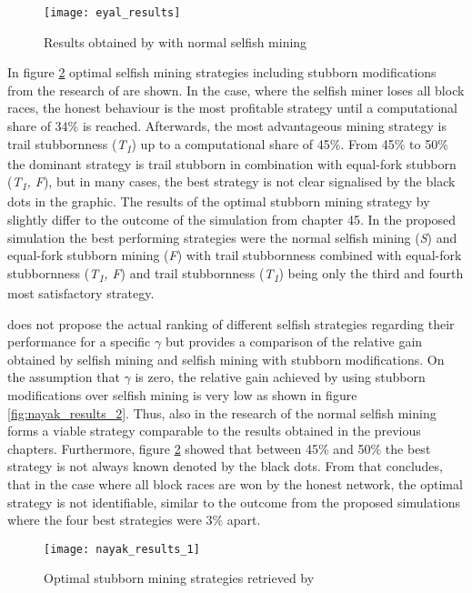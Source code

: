 \begin{figure}[t]
\texttt{[image: eyal\_results]}
\centering
\caption{Results obtained by \cite{eyal2014majority} with normal selfish mining}
\label{fig:eyal_results}
\end{figure}

In figure \ref{fig:nayak_results_1} optimal selfish mining strategies including stubborn modifications from the research of \cite{nayak2016stubborn} are shown.
In the case, where the selfish miner loses all block races, the honest behaviour is the most profitable strategy until a computational share of 34\% is reached.
Afterwards, the most advantageous mining strategy is trail stubbornness (\textit{T\textsubscript{1}}) up to a computational share of 45\%.
From 45\% to 50\% the dominant strategy is trail stubborn in combination with equal-fork stubborn (\textit{T\textsubscript{1}, F}), but in many cases, the best strategy is not clear signalised by the black dots in the graphic.
The results of the optimal stubborn mining strategy by \cite{nayak2016stubborn} slightly differ to the outcome of the simulation from chapter 45.
In the proposed simulation the best performing strategies were the normal selfish mining (\textit{S}) and equal-fork stubborn mining (\textit{F}) with trail stubbornness combined with equal-fork stubbornness (\textit{T\textsubscript{1}, F}) and trail stubbornness (\textit{T\textsubscript{1}}) being only the third and fourth most satisfactory strategy.

\cite{nayak2016stubborn} does not propose the actual ranking of different selfish strategies regarding their performance for a specific $\gamma$ but provides a comparison of the relative gain obtained by selfish mining and selfish mining with stubborn modifications.
On the assumption that $\gamma$ is zero, the relative gain achieved by using stubborn modifications over selfish mining is very low as shown in figure \ref{fig:nayak_results_2}.
Thus, also in the research of \cite{nayak2016stubborn} the normal selfish mining forms a viable strategy comparable to the results obtained in the previous chapters.
Furthermore, figure \ref{fig:nayak_results_1} showed that between 45\% and 50\% the best strategy is not always known denoted by the black dots.
From that concludes, that in the case where all block races are won by the honest network, the optimal strategy is not identifiable, similar to the outcome from the proposed simulations where the four best strategies were 3\% apart.

\begin{figure}[t]
\texttt{[image: nayak\_results\_1]}
\centering
\caption{Optimal stubborn mining strategies retrieved by \cite{nayak2016stubborn}}
\label{fig:nayak_results_1}
\end{figure}


